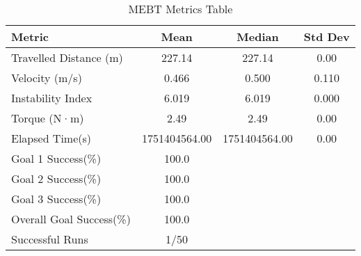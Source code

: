 \documentclass{article}
\begin{document}
\begin{table}[htbp]
\centering
\caption{MEBT Metrics Table}
\label{tab:simulation-metrics}
\begin{tabular}{@{} l S[table-format=3.2] S[table-format=3.2] S[table-format=1.3] @{}}
\toprule
\textbf{Metric} & \textbf{Mean} & \textbf{Median} & \textbf{Std Dev} \\
\midrule
Travelled Distance (m) & 227.14 & 227.14 & 0.00 \\
Velocity (m/s) & 0.466 & 0.500 & 0.110 \\
Instability Index & 6.019 & 6.019 & 0.000 \\
Torque (N·m) & 2.49 & 2.49 & 0.00 \\
Elapsed Time(s) & 1751404564.00 & 1751404564.00 & 0.00 \\
Goal 1 Success(\%) & {100.0} \\
Goal 2 Success(\%) & {100.0} \\
Goal 3 Success(\%) & {100.0} \\
Overall Goal Success(\%) & {100.0} \\
Successful Runs & {1/50} \\

\bottomrule
\end{tabular}
\end{table}
\end{document}
